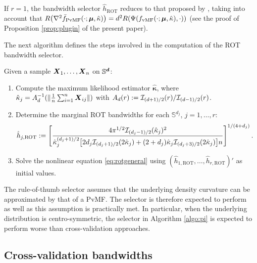 \documentclass[oneside,11pt]{article}
\begin{document}
\begin{remark}
If $r=1$, the bandwidth selector $\hat{h}_\mathrm{ROT}$ reduces to that proposed by \citet[Proposition 2]{Garcia-Portugues2013a}, taking into account that $R\big(\nabla^2 \bar{f}_\mathrm{PvMF}(\cdot ; \boldsymbol{\mu},\hat{\kappa})\big)=\allowbreak d^2 R(\Psi(f_{\mathrm{vMF}}(\cdot ;\boldsymbol\mu, \hat\kappa), \cdot))$ (see the proof of Proposition \ref{prop:plugin} of the present paper).
\end{remark}

The next algorithm defines the steps involved in the computation of the ROT bandwidth selector.

\begin{algo} \label{algo:pi}
Given a sample $\boldsymbol{X}_1,\ldots,\boldsymbol{X}_n$ on $\mathbb{S}^{\boldsymbol{d}}$:
\begin{enumerate}
    \item Compute the maximum likelihood estimator $\hat{\boldsymbol{\kappa}}$, where $\hat{\kappa}_j=A_{d}^{-1}(\|\frac{1}{n}\sum_{i=1}^n\boldsymbol{X}_{ij}\|)$ with $A_d(r):=\mathcal{I}_{(d+1)/2}(r)/\mathcal{I}_{(d-1)/2}(r)$.
    \item Determine the marginal ROT bandwidths for each $\mathbb{S}^{d_j}$,  $j=1,\ldots, r$:
    \begin{align*}
        \hat{h}_{j,\mathrm{ROT}}:=\left[\frac{4 \pi^{1/2} \mathcal{I}_{(d_j-1)/2}(\hat{\kappa}_j)^2}{\hat{\kappa}_j^{(d_j+1)/2}\big[2 d_j \mathcal{I}_{(d_j+1)/2}(2 \hat{\kappa}_j)+(2+d_j) \hat{\kappa}_j \mathcal{I}_{(d_j+3)/2}(2 \hat{\kappa}_j)\big] n}\right]^{1/(4+d_j)}.
    \end{align*}
    \item Solve the nonlinear equation \eqref{eq:rotgeneral} using $(\hat{h}_{1,\mathrm{ROT}},\ldots,\hat{h}_{r,\mathrm{ROT}})'$ as initial values.
\end{enumerate}
\end{algo}

The rule-of-thumb selector assumes that the underlying density curvature can be approximated by that of a PvMF. The selector is therefore expected to perform as well as this assumption is practically met. In particular, when the underlying distribution is centro-symmetric, the selector in Algorithm \ref{algo:pi} is expected to perform worse than cross-validation approaches.

\subsection{Cross-validation bandwidths}
\label{sec:bw_cv}
\end{document}
